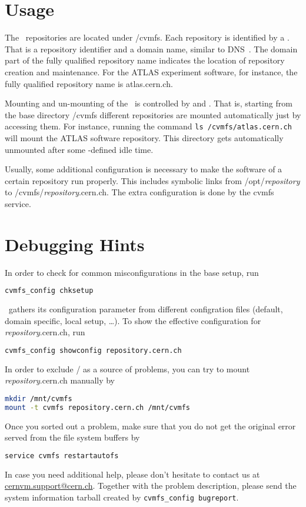 \section{Usage}
The \cvmfs\ repositories are located under /cvmfs.
Each repository is identified by a .
That is a repository identifier and a domain name, similar to DNS~\cite{rfc1035}.
The domain part of the fully qualified repository name indicates the location of repository creation and maintenance.
For the ATLAS experiment software, for instance, the fully qualified repository name is atlas.cern.ch.

Mounting and un-mounting of the \cvmfs\ is controlled by  and .
That is, starting from the base directory /cvmfs different repositories are mounted automatically just by accessing them.
For instance, running the command \lstinline{ls /cvmfs/atlas.cern.ch} will mount the ATLAS software repository.
This directory gets automatically unmounted after some -defined idle time.

Usually, some additional configuration is necessary to make the software of a certain repository run properly.
This includes symbolic links from /opt/\emph{repository} to /cvmfs/\emph{repository}.cern.ch.
The extra configuration is done by the cvmfs service.

\section{Debugging Hints}

In order to check for common misconfigurations in the base setup, run
\begin{lstlisting}[language=bash]
cvmfs_config chksetup
\end{lstlisting}

\cvmfs\ gathers its configuration parameter from different configration files (default, domain specific, local setup, \dots).  
To show the effective configuration for \emph{repository}.cern.ch, run
\begin{lstlisting}[language=bash]
cvmfs_config showconfig repository.cern.ch
\end{lstlisting}

In order to exclude / as a source of problems, you can try to mount \emph{repository}.cern.ch manually by
\begin{lstlisting}[language=bash]
mkdir /mnt/cvmfs
mount -t cvmfs repository.cern.ch /mnt/cvmfs
\end{lstlisting}

Once you sorted out a problem, make sure that you do not get the original error served from the file system buffers by
\begin{lstlisting}[language=bash]
service cvmfs restartautofs
\end{lstlisting}


In case you need additional help, please don't hesitate to contact us at \url{cernvm.support@cern.ch}.
Together with the problem description, please send the system information tarball created by \texttt{cvmfs\_config bugreport}.



